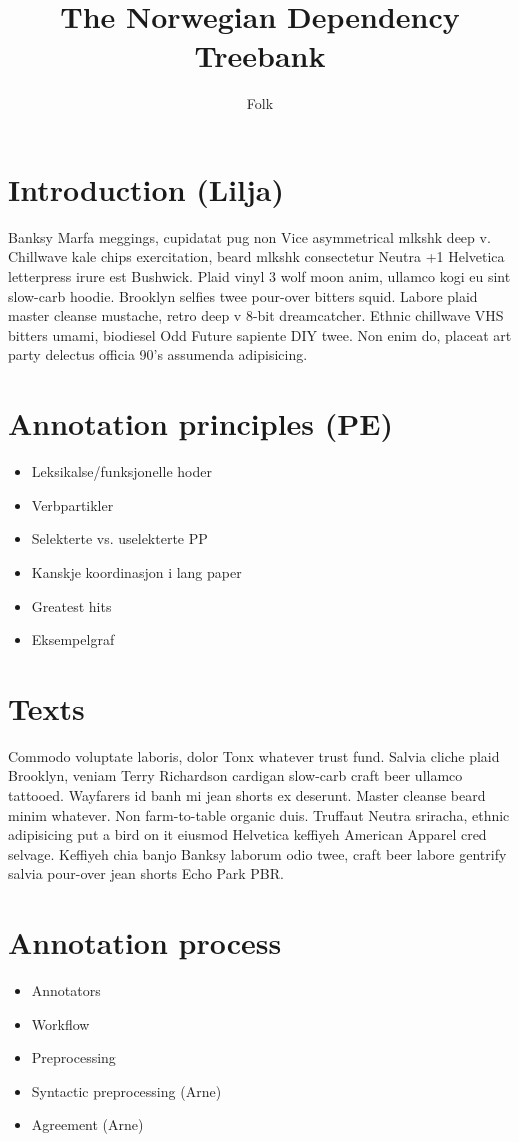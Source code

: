 \documentclass[10pt,a4paper]{article}
\title{The Norwegian Dependency Treebank}
\author{Folk}
\begin{document}
\maketitle

\section{Introduction (Lilja)}
Banksy Marfa meggings, cupidatat pug non Vice asymmetrical mlkshk deep v.
Chillwave kale chips exercitation, beard mlkshk consectetur Neutra +1
Helvetica letterpress irure est Bushwick. Plaid vinyl 3 wolf moon anim,
ullamco kogi eu sint slow-carb hoodie. Brooklyn selfies twee pour-over bitters
squid. Labore plaid master cleanse mustache, retro deep v 8-bit dreamcatcher.
Ethnic chillwave VHS bitters umami, biodiesel Odd Future sapiente DIY twee.
Non enim do, placeat art party delectus officia 90's assumenda adipisicing.

\section{Annotation principles (PE)}
\begin{itemize}
    \item Leksikalse/funksjonelle hoder
    \item Verbpartikler
    \item Selekterte vs. uselekterte PP
    \item Kanskje koordinasjon i lang paper 
    \item Greatest hits
    \item Eksempelgraf
\end{itemize}

\section{Texts}
Commodo voluptate laboris, dolor Tonx whatever trust fund. Salvia cliche plaid
Brooklyn, veniam Terry Richardson cardigan slow-carb craft beer ullamco
tattooed. Wayfarers id banh mi jean shorts ex deserunt. Master cleanse beard
minim whatever. Non farm-to-table organic duis. Truffaut Neutra sriracha,
ethnic adipisicing put a bird on it eiusmod Helvetica keffiyeh American
Apparel cred selvage. Keffiyeh chia banjo Banksy laborum odio twee, craft beer
labore gentrify salvia pour-over jean shorts Echo Park PBR.

\section{Annotation process}
\begin{itemize}
    \item Annotators
    \item Workflow
    \item Preprocessing
    \item Syntactic preprocessing (Arne)
    \item Agreement (Arne)
\end{itemize}
\end{document}
